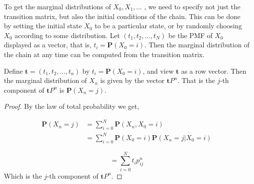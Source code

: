 To get the marginal distributions of $X_0, X_1,...$ , we need to specify not just the
transition matrix, but also the initial conditions of the chain. This can be done by
setting the initial state $X_{0}$ to be a particular state, or by randomly choosing $X_0$
according to some distribution. Let $(t_1, t_2,...,t_N)$ be the PMF of $X_{0}$ displayed as
a vector, that is, $t_i = \mathbf{P}(X_0 = i)$. Then the marginal distribution of the chain at any time can be computed from the transition matrix.

\begin{proposition}
    Define $ \mathbf{t} = (t_{1}, t_{2}, \ldots, t_{n})$ by $ t_{i}=\mathbf{P}(X_{0}=i) $, and view $ \mathbf{t} $ as a row vector.
    Then the marginal distribution of $ X_{n} $ is given by the vector $ \mathbf{t}P^{n} $. That is the $ j $-th component of  $ \mathbf{t}P^{n} $ 
    is $ \mathbf{P}(X_{n}=j) $.
\end{proposition}
\begin{proof}
    By the law of total probability we get,

    \begin{align*}
        \mathbf{P}(X_{n}=j) &= \sum_{i=0}^{N} \mathbf{P}(X_{n},X_{0}=i)\\
                            &= \sum_{i=0}^{N} \mathbf{P}(X_{0}=i)\mathbf{P}(X_{n}=j|X_{0}=i)
    \end{align*}

    \begin{equation*}
                                    = \sum_{i=0}^{N} t_{i}p^{n}_{ij}
    \end{equation*}
    Which is the $ j $-th component of  $ \mathbf{t}P^{n} $.
\end{proof}

